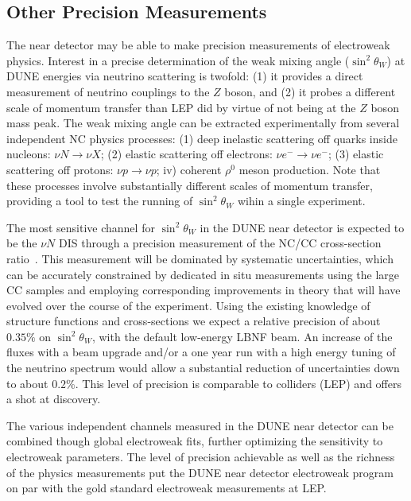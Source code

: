 \subsection{Other Precision Measurements}

The near detector may be able to make precision measurements of electroweak physics.  
Interest in a precise determination of the weak mixing angle ($\sin^2 \theta_W$) at DUNE 
energies via neutrino scattering is twofold: (1) it provides a direct measurement of neutrino couplings to 
the $Z$ boson, and (2) it probes a different scale of momentum transfer than LEP did by virtue
of not being at the $Z$ boson mass peak. 
% 
The weak mixing angle can be extracted experimentally from several independent NC physics processes:
(1) deep inelastic scattering off quarks inside nucleons: $\nu N \to \nu X$; (2) elastic scattering off electrons: $\nu e^- \to \nu e^-$; 
(3) elastic scattering off protons: $\nu p \to \nu p$; iv) coherent $\rho^0$ meson production. 
Note that these processes involve
substantially different scales of momentum transfer, providing a tool
to test the running of $\sin^2 \theta_W$ wihin a single experiment. 

The most sensitive channel for $\sin^2 \theta_W$ 
in the DUNE near detector is expected to be the $\nu N$ DIS through a precision measurement 
of the NC/CC cross-section ratio~\cite{near-detector-EW}. This measurement will be dominated by systematic uncertainties, which can be 
accurately constrained by dedicated in situ measurements using the large CC samples and employing corresponding 
improvements in theory that will have evolved over the course of the experiment. Using the existing knowledge of 
structure functions and cross-sections we expect a relative precision of about $0.35\%$ on $\sin^2 \theta_W$, with 
the default low-energy LBNF beam. An increase of the fluxes with a beam upgrade and/or a one year run with a high 
energy tuning of the neutrino spectrum would allow a substantial reduction of uncertainties down to about $0.2\%$. 
This level of precision is comparable to colliders (LEP) and offers a shot at discovery.
 
The various independent channels measured in the DUNE near detector can be combined though global electroweak fits, 
further optimizing the sensitivity to electroweak parameters. The level of precision achievable as well as the richness of 
the physics measurements put the DUNE near detector electroweak program on par with the gold standard electroweak measurements at LEP.   



